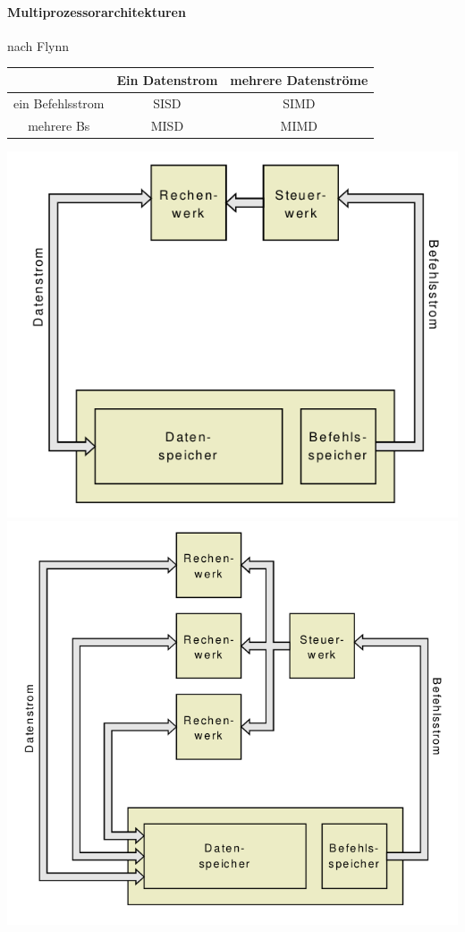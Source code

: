 \documentclass[a4paper]{article}
\begin{document}
\begin{multicols}{3}
  \paragraph{Multiprozessorarchitekturen}
  nach Flynn
  \begin{center}
    \begin{tabular}{ c | c | c}
                       & Ein Datenstrom & mehrere Datenströme \\\hline
      ein Befehlsstrom & SISD           & SIMD                \\
      mehrere Bs       & MISD           & MIMD 
    \end{tabular}
  \end{center}
  \begin{center}
    \includegraphics[width=\textwidth/13]{Assets/RA2_SISD.png}
    \includegraphics[width=\textwidth/13]{Assets/RA2_SIMD.png}

\end{center}
\end{multicols}
\end{document}

